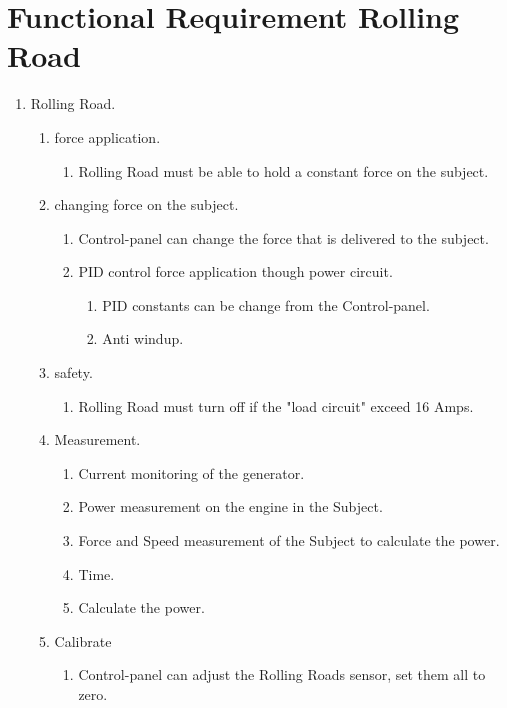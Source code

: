 \section{Functional Requirement Rolling Road}

\begin{enumerate}
	\item Rolling Road.
	\begin{enumerate}
		\item force application.
		\begin{enumerate}
			\item Rolling Road must be able to hold a constant force on the subject.
		\end{enumerate}
		\item changing force on the subject.
		\begin{enumerate}
			\item Control-panel can change the force that is delivered to the subject.
			\item PID control force application though power circuit.
			\begin{enumerate}
				\item PID constants can be change from the Control-panel.
				\item Anti windup.
			\end{enumerate}
		\end{enumerate}
		\item safety.
		\begin{enumerate}
			\item Rolling Road must turn off if the "load circuit" exceed 16 Amps.
		\end{enumerate}
		\item Measurement.
		\begin{enumerate}
			\item Current monitoring of the generator.
			\item Power measurement on the engine in the Subject.
			\item Force and Speed measurement of the Subject to calculate the power.
			\item Time.
			\item Calculate the power.
		\end{enumerate}
		\item Calibrate
		\begin{enumerate}
			\item Control-panel can adjust the Rolling Roads sensor, set them all to zero.
		\end{enumerate}

\end{enumerate}
\end{enumerate}
